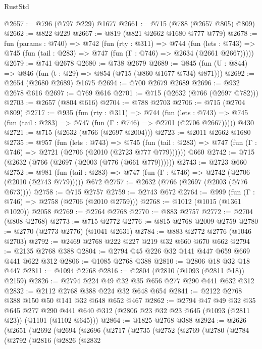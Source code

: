 \begin{lexlean}{RustStd}
\begin{coremodule}
{\begin{coremodule}
{{{{{{{{@2657 := @796 (@797 @229) @1677
@2661 := @715 (@788 (@2657 @805) @809)
@2662 := @822 @229
@2667 := @819 (@821 @2662 @1680 @777 @779)
@2678 := fun (params : @740) =>
  @742
    (fun (rty : @311) =>
    @744
      (fun (lets : @743) =>
      @745 (fun (tail : @283) => @747 (fun (Γ : @746) => @2634 (@2661 @2667)))))
@2679 := @741 @2678
@2680 := @738 @2679
@2689 := @845 (fun (U : @844) => @846 (fun (t : @29) => @854 (@715 (@860 @1677 @734) @871)))
@2692 := @2654 (@2680 @2689) @1675
@2694 := @700 @2679 @2689
@2696 := @932 @2678 @616
@2697 := @769 @616
@2701 := @715 (@2632 (@766 (@2697 @782)))
@2703 := @2657 (@804 @616)
@2704 := @788 @2703
@2706 := @715 (@2704 @809)
@2717 := @935
    (fun (rty : @311) =>
    @744
      (fun (lets : @743) =>
      @745 (fun (tail : @283) => @747 (fun (Γ : @746) => @2701 (@2706 @2667)))))
    @430
@2721 := @715 (@2632 (@766 (@2697 @2004)))
@2723 := @2011 @2662 @1680
@2735 := @957
    (fun (lets : @743) =>
    @745 (fun (tail : @283) => @747 (fun (Γ : @746) => @2721 (@2706 (@2010 (@2723 @777 @779))))))
    @660
@2742 := @715 (@2632 (@766 (@2697 (@2003 (@776 (@661 @779))))))
@2743 := @2723 @660
@2752 := @981
    (fun (tail : @283) => @747 (fun (Γ : @746) => @2742 (@2706 (@2010 (@2743 @779)))))
    @672
@2757 := @2632 (@766 (@2697 (@2003 (@776 @673))))
@2758 := @715 @2757
@2759 := @2743 @672
@2764 := @999 (fun (Γ : @746) => @2758 (@2706 (@2010 @2759)))
@2768 := @1012 (@1015 (@1361 @1020)) @2058
@2769 := @2764 @2768
@2770 := @883 @2757
@2772 := @2704 (@808 @2768)
@2773 := @715 @2772
@2776 := @815 @2768 @2009 @2759
@2780 := @2770 (@2773 @2776) (@1041 @2631)
@2784 := @883 @2772 @2776 (@1046 @2703)
@2792 := @2469 @2768 @222 @227 @219 @32 @660 @670 @662
@2794 := @2135 @2768 @388
@2804 := @2794 @45 @226 @32 @141 @447 @659 @669 @441 @622 @312
@2806 := @1085 @2768 @388
@2810 := @2806 @18 @32 @18 @447
@2811 := @1094 @2768
@2816 := @2804 (@2810 (@1093 (@2811 @18)) @2159)
@2826 := @2794 @224 @49 @32 @35 @656 @277 @290 @441 @632 @312
@2832 := @2112 @2768 @388 @224 @32 @648 @654
@2841 := @2122 @2768 @388 @150 @50 @141 @32 @648 @652 @467
@2862 := @2794
    @47
    @49
    @32
    @35
    @645
    @277
    @290
    @441
    @640
    @312
    (@2806 @23 @32 @23 @645 (@1093 (@2811 @23)) (@1101 (@1102 @645)))
@2864 := @1825 @2768 @388
@2924 := @2626
    (@2651
      (@2692
        (@2694
          (@2696
            (@2717
              (@2735
                (@2752
                  (@2769
                    (@2780
                      (@2784
                        (@2792
                          (@2816
                            (@2826
                              (@2832
}}}}}}}}
\end{coremodule}}
\end{coremodule}
\end{lexlean}
